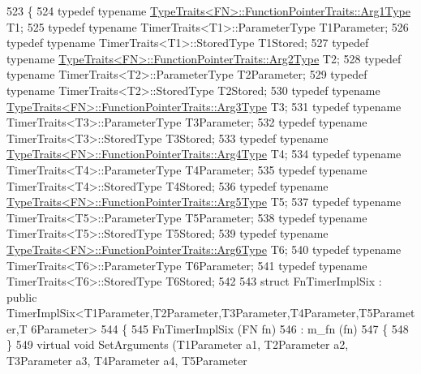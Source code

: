 \begin{DoxyCode}
523 \{
524   \textcolor{keyword}{typedef} \textcolor{keyword}{typename} \hyperlink{structTypeTraits}{TypeTraits<FN>::FunctionPointerTraits::Arg1Type}
       T1;
525   \textcolor{keyword}{typedef} \textcolor{keyword}{typename} TimerTraits<T1>::ParameterType T1Parameter;
526   \textcolor{keyword}{typedef} \textcolor{keyword}{typename} TimerTraits<T1>::StoredType T1Stored;
527   \textcolor{keyword}{typedef} \textcolor{keyword}{typename} \hyperlink{structTypeTraits}{TypeTraits<FN>::FunctionPointerTraits::Arg2Type}
       T2;
528   \textcolor{keyword}{typedef} \textcolor{keyword}{typename} TimerTraits<T2>::ParameterType T2Parameter;
529   \textcolor{keyword}{typedef} \textcolor{keyword}{typename} TimerTraits<T2>::StoredType T2Stored;
530   \textcolor{keyword}{typedef} \textcolor{keyword}{typename} \hyperlink{structTypeTraits}{TypeTraits<FN>::FunctionPointerTraits::Arg3Type}
       T3;
531   \textcolor{keyword}{typedef} \textcolor{keyword}{typename} TimerTraits<T3>::ParameterType T3Parameter;
532   \textcolor{keyword}{typedef} \textcolor{keyword}{typename} TimerTraits<T3>::StoredType T3Stored;
533   \textcolor{keyword}{typedef} \textcolor{keyword}{typename} \hyperlink{structTypeTraits}{TypeTraits<FN>::FunctionPointerTraits::Arg4Type}
       T4;
534   \textcolor{keyword}{typedef} \textcolor{keyword}{typename} TimerTraits<T4>::ParameterType T4Parameter;
535   \textcolor{keyword}{typedef} \textcolor{keyword}{typename} TimerTraits<T4>::StoredType T4Stored;
536   \textcolor{keyword}{typedef} \textcolor{keyword}{typename} \hyperlink{structTypeTraits}{TypeTraits<FN>::FunctionPointerTraits::Arg5Type}
       T5;
537   \textcolor{keyword}{typedef} \textcolor{keyword}{typename} TimerTraits<T5>::ParameterType T5Parameter;
538   \textcolor{keyword}{typedef} \textcolor{keyword}{typename} TimerTraits<T5>::StoredType T5Stored;
539   \textcolor{keyword}{typedef} \textcolor{keyword}{typename} \hyperlink{structTypeTraits}{TypeTraits<FN>::FunctionPointerTraits::Arg6Type}
       T6;
540   \textcolor{keyword}{typedef} \textcolor{keyword}{typename} TimerTraits<T6>::ParameterType T6Parameter;
541   \textcolor{keyword}{typedef} \textcolor{keyword}{typename} TimerTraits<T6>::StoredType T6Stored;
542 
543   \textcolor{keyword}{struct }FnTimerImplSix : \textcolor{keyword}{public} TimerImplSix<T1Parameter,T2Parameter,T3Parameter,T4Parameter,T5Parameter,T
      6Parameter>
544   \{
545     FnTimerImplSix (FN fn)
546       : m\_fn (fn)
547     \{
548     \}
549     \textcolor{keyword}{virtual} \textcolor{keywordtype}{void} SetArguments (T1Parameter a1, T2Parameter a2, T3Parameter a3, T4Parameter a4, T5Parameter 

\end{DoxyCode}
